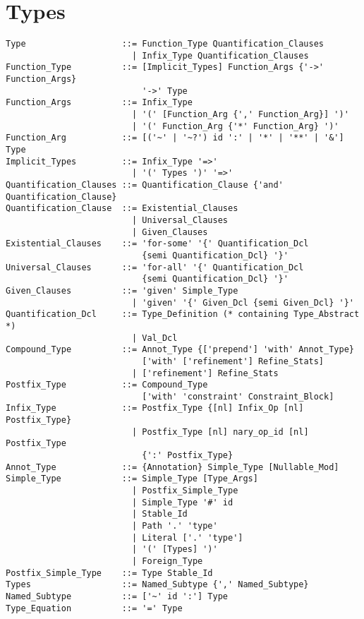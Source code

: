 
\chapter{Types}

\minitoc

\newpage

\syntax\begin{lstlisting}
Type                   ::= Function_Type Quantification_Clauses
                         | Infix_Type Quantification_Clauses
Function_Type          ::= [Implicit_Types] Function_Args {'->' Function_Args} 
                           '->' Type
Function_Args          ::= Infix_Type
                         | '(' [Function_Arg {',' Function_Arg}] ')'
                         | '(' Function_Arg {'*' Function_Arg} ')'
Function_Arg           ::= [('~' | '~?') id ':' | '*' | '**' | '&'] Type
Implicit_Types         ::= Infix_Type '=>'
                         | '(' Types ')' '=>'
Quantification_Clauses ::= Quantification_Clause {'and' Quantification_Clause}
Quantification_Clause  ::= Existential_Clauses
                         | Universal_Clauses
                         | Given_Clauses
Existential_Clauses    ::= 'for-some' '{' Quantification_Dcl
                           {semi Quantification_Dcl} '}'
Universal_Clauses      ::= 'for-all' '{' Quantification_Dcl
                           {semi Quantification_Dcl} '}'
Given_Clauses          ::= 'given' Simple_Type
                         | 'given' '{' Given_Dcl {semi Given_Dcl} '}'
Quantification_Dcl     ::= Type_Definition (* containing Type_Abstract *)
                         | Val_Dcl
Compound_Type          ::= Annot_Type {['prepend'] 'with' Annot_Type} 
                           ['with' ['refinement'] Refine_Stats]
                         | ['refinement'] Refine_Stats
Postfix_Type           ::= Compound_Type 
                           ['with' 'constraint' Constraint_Block]
Infix_Type             ::= Postfix_Type {[nl] Infix_Op [nl] Postfix_Type}
                         | Postfix_Type [nl] nary_op_id [nl] Postfix_Type 
                           {':' Postfix_Type}
Annot_Type             ::= {Annotation} Simple_Type [Nullable_Mod]
Simple_Type            ::= Simple_Type [Type_Args]
                         | Postfix_Simple_Type
                         | Simple_Type '#' id
                         | Stable_Id
                         | Path '.' 'type'
                         | Literal ['.' 'type']
                         | '(' [Types] ')'
                         | Foreign_Type
Postfix_Simple_Type    ::= Type Stable_Id
Types                  ::= Named_Subtype {',' Named_Subtype}
Named_Subtype          ::= ['~' id ':'] Type
Type_Equation          ::= '=' Type
\end{lstlisting}

